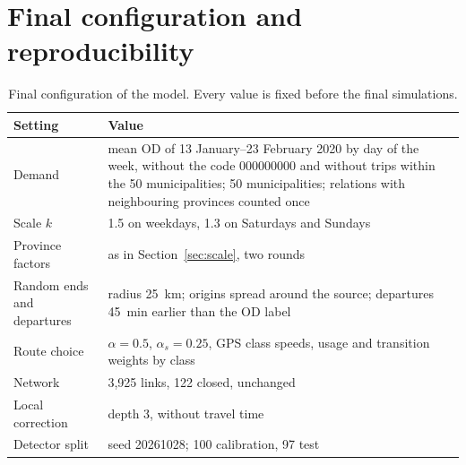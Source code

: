 \documentclass[11pt,a4paper]{article}
\begin{document}
\section{Final configuration and reproducibility}
\label{sec:reproducibility}

\begin{table}[htbp]\centering
\caption{Final configuration of the model. Every value is fixed before the final simulations.}
\label{tab:final_config}
\begin{tabularx}{\textwidth}{@{}lX@{}}\toprule
Setting & Value \\\midrule
Demand & mean OD of 13 January--23 February 2020 by day of the week, without the code 000000000 and without trips within the 50 municipalities; 50 municipalities; relations with neighbouring provinces counted once \\
Scale $k$ & 1.5 on weekdays, 1.3 on Saturdays and Sundays \\
Province factors & as in Section~\ref{sec:scale}, two rounds \\
Random ends and departures & radius 25~km; origins spread around the source; departures 45~min earlier than the OD label \\
Route choice & $\alpha=0.5$, $\alpha_s=0.25$, GPS class speeds, usage and transition weights by class \\
Network & 3,925 links, 122 closed, unchanged \\
Local correction & depth 3, without travel time \\
Detector split & seed 20261028; 100 calibration, 97 test \\
\bottomrule\end{tabularx}
\end{table}
\end{document}
